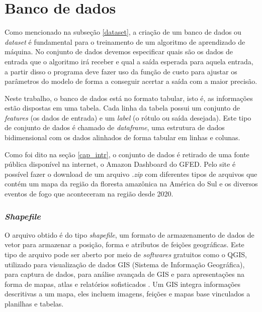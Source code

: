 \chapter{Banco de dados}
\label{banco}


Como mencionado na subseção \ref{dataset}, a criação de um banco de dados ou \textit{dataset} é fundamental para o treinamento de um algoritmo de aprendizado de máquina. No conjunto de dados devemos especificar quais são os dados de entrada que o algoritmo irá receber e qual a saída esperada para aquela entrada, a partir disso o programa deve fazer uso da função de custo para ajustar os parâmetros do modelo de forma a conseguir acertar a saída com a maior precisão.

Neste trabalho, o banco de dados está no formato tabular, isto é, as informações estão dispostas em uma tabela. Cada linha da tabela possui um conjunto de \textit{features} (os dados de entrada) e um \textit{label} (o rótulo ou saída desejada). Este tipo de conjunto de dados é chamado de \textit{dataframe}, uma estrutura de dados bidimensional com os dados alinhados de forma tabular em linhas e colunas.

Como foi dito na seção \ref{cap_intr}, o conjunto de dados é retirado de uma fonte pública disponível na internet, o Amazon Dashboard do GFED. Pelo site é possível fazer o download de um arquivo \textit{.zip} com diferentes tipos de arquivos que contém um mapa da região da floresta amazônica na América do Sul e os diversos eventos de fogo que aconteceram na região desde 2020.

\subsection{\textit{Shapefile}}
\label{sec:shp}

O arquivo obtido é do tipo \textit{shapefile}, um formato de armazenamento de dados de vetor para armazenar a posição, forma e atributos de feições geográficas. Este tipo de arquivo pode ser aberto por meio de \textit{softwares} gratuitos como o QGIS, utilizado para visualização de dados GIS (Sistema de Informação Geográfica), para captura de dados, para análise avançada de GIS e para apresentações na forma de mapas, atlas e relatórios sofisticados \cite{qgis}. Um GIS integra informações descritivas a um mapa, eles incluem imagens, feições e mapas base vinculados a planilhas e tabelas.

